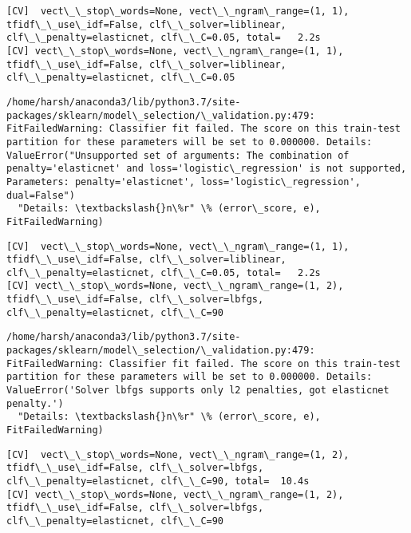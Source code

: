 \documentclass[11pt]{article}
\begin{document}
    \begin{Verbatim}[commandchars=\\\{\}]
[CV]  vect\_\_stop\_words=None, vect\_\_ngram\_range=(1, 1), tfidf\_\_use\_idf=False, clf\_\_solver=liblinear, clf\_\_penalty=elasticnet, clf\_\_C=0.05, total=   2.2s
[CV] vect\_\_stop\_words=None, vect\_\_ngram\_range=(1, 1), tfidf\_\_use\_idf=False, clf\_\_solver=liblinear, clf\_\_penalty=elasticnet, clf\_\_C=0.05 

    \end{Verbatim}

    \begin{Verbatim}[commandchars=\\\{\}]
/home/harsh/anaconda3/lib/python3.7/site-packages/sklearn/model\_selection/\_validation.py:479: FitFailedWarning: Classifier fit failed. The score on this train-test partition for these parameters will be set to 0.000000. Details: 
ValueError("Unsupported set of arguments: The combination of penalty='elasticnet' and loss='logistic\_regression' is not supported, Parameters: penalty='elasticnet', loss='logistic\_regression', dual=False")
  "Details: \textbackslash{}n\%r" \% (error\_score, e), FitFailedWarning)

    \end{Verbatim}

    \begin{Verbatim}[commandchars=\\\{\}]
[CV]  vect\_\_stop\_words=None, vect\_\_ngram\_range=(1, 1), tfidf\_\_use\_idf=False, clf\_\_solver=liblinear, clf\_\_penalty=elasticnet, clf\_\_C=0.05, total=   2.2s
[CV] vect\_\_stop\_words=None, vect\_\_ngram\_range=(1, 2), tfidf\_\_use\_idf=False, clf\_\_solver=lbfgs, clf\_\_penalty=elasticnet, clf\_\_C=90 

    \end{Verbatim}

    \begin{Verbatim}[commandchars=\\\{\}]
/home/harsh/anaconda3/lib/python3.7/site-packages/sklearn/model\_selection/\_validation.py:479: FitFailedWarning: Classifier fit failed. The score on this train-test partition for these parameters will be set to 0.000000. Details: 
ValueError('Solver lbfgs supports only l2 penalties, got elasticnet penalty.')
  "Details: \textbackslash{}n\%r" \% (error\_score, e), FitFailedWarning)

    \end{Verbatim}

    \begin{Verbatim}[commandchars=\\\{\}]
[CV]  vect\_\_stop\_words=None, vect\_\_ngram\_range=(1, 2), tfidf\_\_use\_idf=False, clf\_\_solver=lbfgs, clf\_\_penalty=elasticnet, clf\_\_C=90, total=  10.4s
[CV] vect\_\_stop\_words=None, vect\_\_ngram\_range=(1, 2), tfidf\_\_use\_idf=False, clf\_\_solver=lbfgs, clf\_\_penalty=elasticnet, clf\_\_C=90 

    \end{Verbatim}
\end{document}
